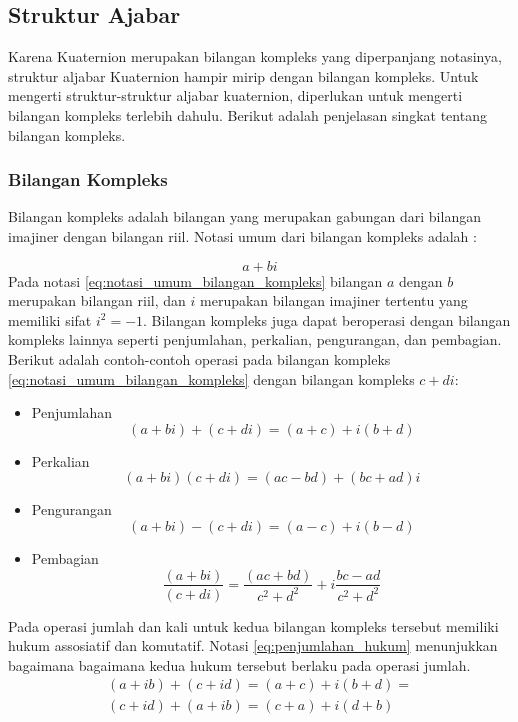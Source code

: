 \subsection{Struktur Ajabar}
Karena Kuaternion merupakan bilangan kompleks yang diperpanjang notasinya, struktur aljabar Kuaternion hampir mirip dengan bilangan kompleks. Untuk mengerti struktur-struktur aljabar kuaternion, diperlukan untuk mengerti  bilangan kompleks terlebih dahulu. Berikut adalah penjelasan singkat tentang bilangan kompleks. 


\subsubsection{Bilangan Kompleks}
\label{sssec:bilangan_kompleks}
\cite{kuipers:1999}
Bilangan kompleks adalah bilangan yang merupakan gabungan dari bilangan imajiner dengan bilangan riil. Notasi umum dari bilangan kompleks adalah :

\begin{equation}
	a+bi
\label{eq:notasi_umum_bilangan_kompleks}
\end{equation}
Pada notasi \ref{eq:notasi_umum_bilangan_kompleks} bilangan \(a\) dengan \(b\) merupakan bilangan riil, dan \(i\) merupakan bilangan imajiner tertentu yang memiliki sifat \(i^2=-1\). Bilangan kompleks juga dapat beroperasi dengan bilangan kompleks lainnya seperti penjumlahan, perkalian, pengurangan, dan pembagian. Berikut adalah contoh-contoh operasi pada bilangan kompleks \ref{eq:notasi_umum_bilangan_kompleks} dengan bilangan kompleks \(c+di\):
\begin{itemize}
	\item Penjumlahan\\
	\[
	 (a + bi) + (c + di) = (a+c) + i(b+d)
	\]
	\item Perkalian\\
	\[
	 (a + bi)(c + di) = (ac−bd) + (bc+ad)i
	\]
	\item Pengurangan\\
	\[
	 (a + bi) - (c + di) = (a-c) + i(b-d)
	\]
	\item Pembagian\\
	\[
	 \frac{(a + bi)}{(c + di)} = \frac{(ac+bd)}{c^2+d^2} + i \frac{bc-ad}{c^2+d^2}
	\]
\end{itemize}
Pada operasi jumlah dan kali untuk kedua bilangan kompleks tersebut memiliki hukum assosiatif dan komutatif. Notasi \ref{eq:penjumlahan_hukum} menunjukkan bagaimana bagaimana kedua hukum tersebut berlaku pada operasi jumlah.
\begin{equation}
	\begin{split}
	(a+ib) + (c+id) = (a+c) + i(b+d)=\\
	(c+id) + (a+ib) = (c+a) + i(d+b)
	\end{split}
\label{eq:penjumlahan_hukum}
\end{equation}


